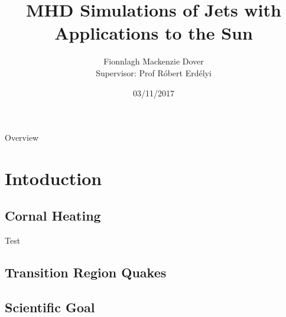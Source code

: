\documentclass{beamer}
\title[ ]{MHD Simulations of Jets with Applications to the Sun} %
\author[Fionnlagh Mackenzie Dover]{Fionnlagh Mackenzie Dover \\ Supervisor: Prof R\'{o}bert Erd\'{e}lyi } %
\institute[SP$^2$RC] %
{
University of Sheffield \\ %
\medskip
}
\date{03/11/2017} %
\begin{document}
\begin{frame}
\titlepage %
\end{frame}

\begin{frame}{Overview}

\tableofcontents %
\end{frame}


\section{Intoduction} %
\subsection{Cornal Heating}
\begin{frame}
Test
\end{frame}

\subsection{Transition Region Quakes} %
\begin{frame}

\end{frame}
\subsection{Scientific Goal}
\begin{frame}

\end{frame}
\end{document}
